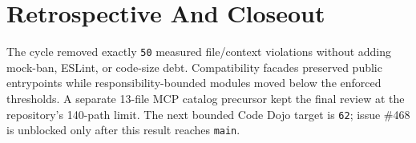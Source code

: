 \section{Retrospective And Closeout}\label{record-245-retrospective-and-closeout}

The cycle removed exactly \texttt{5\allowbreak{}0} measured file/context violations without adding mock-ban, ESLint, or code-size debt. Compatibility facades preserved public entrypoints while responsibility-bounded modules moved below the enforced thresholds. A separate 13-file MCP catalog precursor kept the final review at the repository's 140-path limit. The next bounded Code Dojo target is \texttt{6\allowbreak{}2}; issue \#468 is unblocked only after this result reaches \texttt{m\allowbreak{}a\allowbreak{}i\allowbreak{}n}.

